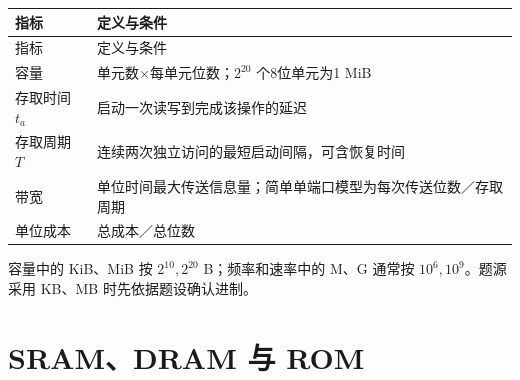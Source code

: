 \par\smallskip
{\fontsize{9.3}{12}\selectfont\setlength{\tabcolsep}{2.5pt}\setlength{\LTleft}{0pt}\setlength{\LTright}{0pt}
\begin{longtable}{@{}>{\raggedright\arraybackslash}p{}>{\raggedright\arraybackslash}p{}@{}}
\toprule
指标 & 定义与条件 \\

\midrule\endfirsthead\toprule
指标 & 定义与条件 \\

\midrule\endhead\bottomrule\endfoot
容量 & 单元数×每单元位数；\(2^{20}\) 个8位单元为1 MiB \\

存取时间 \(t_a\) & 启动一次读写到完成该操作的延迟 \\

存取周期 \(T\) & 连续两次独立访问的最短启动间隔，可含恢复时间 \\

带宽 & 单位时间最大传送信息量；简单单端口模型为每次传送位数／存取周期 \\

单位成本 & 总成本／总位数 \\

\end{longtable}}
\par\smallskip

容量中的 KiB、MiB 按 \(2^{10},2^{20}\) B；频率和速率中的 M、G 通常按 \(10^6,10^9\)。题源采用 KB、MB 时先依据题设确认进制。

\section{SRAM、DRAM 与 ROM}\label{CO03-semiconductor}

